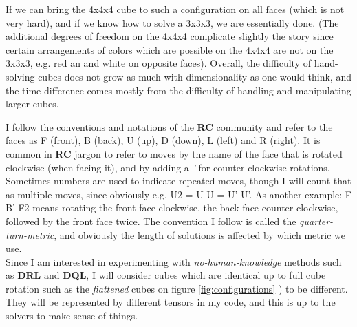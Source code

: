 \noindent If we can bring the 4x4x4 cube to such a configuration on all faces (which is not very hard), and if we know how to solve a 3x3x3, we are essentially done. (The additional degrees of freedom on the 4x4x4 complicate slightly the story since certain arrangements of colors which are possible on the 4x4x4 are not on the 3x3x3, e.g. red an and white on opposite faces). Overall, the difficulty of hand-solving cubes does not grow as much with dimensionality as one would think, and the time difference comes mostly from the difficulty of handling and manipulating larger cubes.




I follow the conventions and notations of the \textbf{RC} community and refer to the faces as F (front), B (back), U (up), D (down), L (left) and R (right). It is common in \textbf{RC} jargon to refer to moves  by the name of the face that is rotated clockwise (when facing it), and by adding a \textit{'} for counter-clockwise rotations. Sometimes numbers are used to indicate repeated moves, though I will count that as multiple moves, since obviously e.g. U2 = U U = U' U'. As another example: F B' F2 means rotating the front face clockwise, the back face counter-clockwise, followed by the front face twice. The convention I follow is called the \textit{quarter-turn-metric}, and obviously the length of solutions is affected by which metric we use.
\\
Since I am interested in experimenting with \textit{no-human-knowledge} methods such as \textbf{DRL} and \textbf{DQL}, I will consider cubes which are identical up to full cube rotation such as the \textit{flattened} cubes on figure \ref{fig:configurations} ) to be different. They will be represented by different tensors in my code, and this is up to the solvers to make sense of things.

